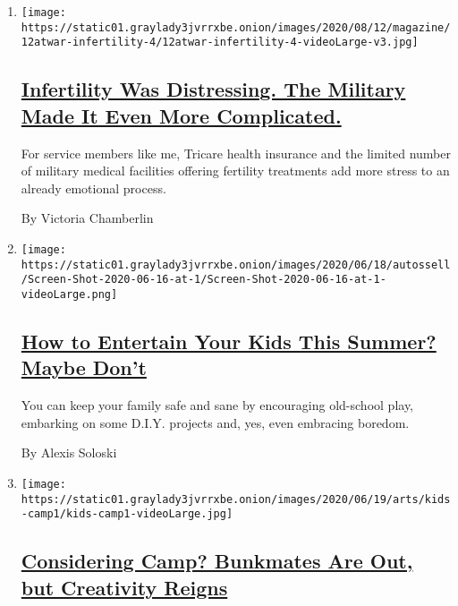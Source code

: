 \begin{enumerate}
\def\labelenumi{\arabic{enumi}.}
\item
  \texttt{[image: https://static01.graylady3jvrrxbe.onion/images/2020/08/12/magazine/12atwar-infertility-4/12atwar-infertility-4-videoLarge-v3.jpg]}

  \hypertarget{infertility-was-distressing-the-military-made-it-even-more-complicated}{%
  \subsection{\texorpdfstring{\href{/2020/08/12/magazine/infertility-military-army.html}{Infertility
  Was Distressing. The Military Made It Even More
  Complicated.}}{Infertility Was Distressing. The Military Made It Even More Complicated.}}\label{infertility-was-distressing-the-military-made-it-even-more-complicated}}

  For service members like me, Tricare health insurance and the limited
  number of military medical facilities offering fertility treatments
  add more stress to an already emotional process.

  By Victoria Chamberlin
\item
  \texttt{[image: https://static01.graylady3jvrrxbe.onion/images/2020/06/18/autossell/Screen-Shot-2020-06-16-at-1/Screen-Shot-2020-06-16-at-1-videoLarge.png]}

  \hypertarget{how-to-entertain-your-kids-this-summer-maybe-dont}{%
  \subsection{\texorpdfstring{\href{/2020/06/18/arts/kids-summer-activities-virus.html}{How
  to Entertain Your Kids This Summer? Maybe
  Don't}}{How to Entertain Your Kids This Summer? Maybe Don't}}\label{how-to-entertain-your-kids-this-summer-maybe-dont}}

  You can keep your family safe and sane by encouraging old-school play,
  embarking on some D.I.Y. projects and, yes, even embracing boredom.

  By Alexis Soloski
\item
  \texttt{[image: https://static01.graylady3jvrrxbe.onion/images/2020/06/19/arts/kids-camp1/kids-camp1-videoLarge.jpg]}

  \hypertarget{considering-camp-bunkmates-are-out-but-creativity-reigns}{%
  \subsection{\texorpdfstring{\href{/2020/06/18/arts/kids-summer-camps-virtual.html}{Considering
  Camp? Bunkmates Are Out, but Creativity
  Reigns}}{Considering Camp? Bunkmates Are Out, but Creativity Reigns}}\label{considering-camp-bunkmates-are-out-but-creativity-reigns}}


\end{enumerate}
